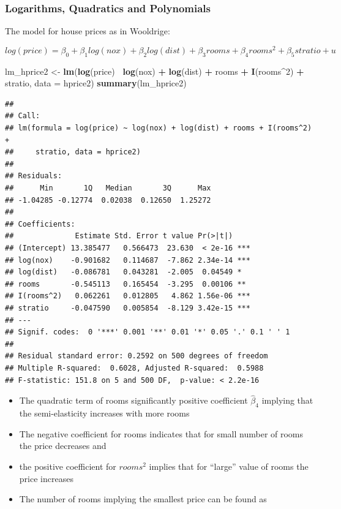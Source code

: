 \documentclass[]{book}
\newenvironment{Shaded}{\begin{snugshade}}{\end{snugshade}}
\newcommand{\DataTypeTok}[1]{\textcolor[rgb]{0.13,0.29,0.53}{#1}}
\newcommand{\DecValTok}[1]{\textcolor[rgb]{0.00,0.00,0.81}{#1}}
\newcommand{\KeywordTok}[1]{\textcolor[rgb]{0.13,0.29,0.53}{\textbf{#1}}}
\newcommand{\NormalTok}[1]{#1}
\newcommand{\OperatorTok}[1]{\textcolor[rgb]{0.81,0.36,0.00}{\textbf{#1}}}
\newcommand{\StringTok}[1]{\textcolor[rgb]{0.31,0.60,0.02}{#1}}
\providecommand{\tightlist}{%
  \setlength{\itemsep}{0pt}\setlength{\parskip}{0pt}}
\begin{document}
\hypertarget{logarithms-quadratics-and-polynomials}{%
\subsubsection{Logarithms, Quadratics and
Polynomials}\label{logarithms-quadratics-and-polynomials}}

The model for house prices as in Wooldrige:

\begin{equation}
log(price) = \beta_0 +  \beta_1 log(nox) + \beta_2 log(dist) + \beta_3 rooms + \beta_4 rooms^{2} + \beta_5 stratio + u 
\end{equation}

\begin{Shaded}
\begin{Highlighting}[]
\NormalTok{lm_hprice2 <-}\StringTok{ }\KeywordTok{lm}\NormalTok{(}\KeywordTok{log}\NormalTok{(price)}\OperatorTok{~}\StringTok{  }\KeywordTok{log}\NormalTok{(nox) }\OperatorTok{+}\StringTok{  }\KeywordTok{log}\NormalTok{(dist) }\OperatorTok{+}\StringTok{ }\NormalTok{rooms }\OperatorTok{+}\StringTok{ }\KeywordTok{I}\NormalTok{(rooms}\OperatorTok{^}\DecValTok{2}\NormalTok{) }\OperatorTok{+}\StringTok{ }\NormalTok{stratio, }\DataTypeTok{data =}\NormalTok{ hprice2)}
\KeywordTok{summary}\NormalTok{(lm_hprice2)}
\end{Highlighting}
\end{Shaded}

\begin{verbatim}
## 
## Call:
## lm(formula = log(price) ~ log(nox) + log(dist) + rooms + I(rooms^2) + 
##     stratio, data = hprice2)
## 
## Residuals:
##      Min       1Q   Median       3Q      Max 
## -1.04285 -0.12774  0.02038  0.12650  1.25272 
## 
## Coefficients:
##              Estimate Std. Error t value Pr(>|t|)    
## (Intercept) 13.385477   0.566473  23.630  < 2e-16 ***
## log(nox)    -0.901682   0.114687  -7.862 2.34e-14 ***
## log(dist)   -0.086781   0.043281  -2.005  0.04549 *  
## rooms       -0.545113   0.165454  -3.295  0.00106 ** 
## I(rooms^2)   0.062261   0.012805   4.862 1.56e-06 ***
## stratio     -0.047590   0.005854  -8.129 3.42e-15 ***
## ---
## Signif. codes:  0 '***' 0.001 '**' 0.01 '*' 0.05 '.' 0.1 ' ' 1
## 
## Residual standard error: 0.2592 on 500 degrees of freedom
## Multiple R-squared:  0.6028, Adjusted R-squared:  0.5988 
## F-statistic: 151.8 on 5 and 500 DF,  p-value: < 2.2e-16
\end{verbatim}

\begin{itemize}
\tightlist
\item
  The quadratic term of rooms significantly positive coefficient
  \(\hat\beta_4\) implying that the semi-elasticity increases with more
  rooms
\item
  The negative coefficient for rooms indicates that for small number of
  rooms the price decreases and
\item
  the positive coefficient for \(rooms^2\) implies that for ``large''
  value of rooms the price increases
\item
  The number of rooms implying the smallest price can be found as
\end{itemize}
\end{document}

